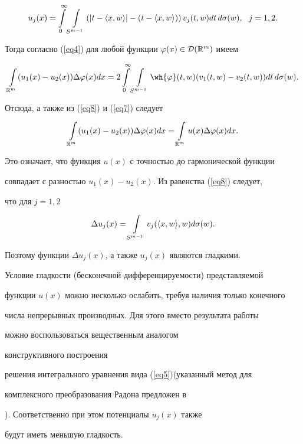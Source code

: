 \begin{pf}
$$


u_{j}(x)=


\int\limits_{0}^{\infty}\int\limits_{S^{m-1}}


\left(|t-\la x,w\ra |-(t-\la x,w\ra )\right)v_j(t,w)dt\,d\sigma(w),


\ \ j=1,2.


$$


Тогда согласно (\ref{eq4}) для любой функции $\varphi(x)\in


{\cal D}(\BR^m)$ имеем 


$$


\int\limits_{\BR^m} (u_1(x)-u_2(x))\Delta\varphi(x)dx=


2\int\limits_{0}^{\infty}\int\limits_{S^{m-1}}\wh{\varphi}(t,w)


(v_1(t,w)-v_2(t,w))dt\,d\sigma(w).


$$


Отсюда, а также из (\ref{eq8}) и (\ref{eq7}) следует


$$


\int\limits_{\BR^m} 


(u_1(x)-u_2(x))\Delta\varphi(x)dx=\int\limits_{\BR^m}


u(x)\Delta\varphi(x)dx.


$$


Это означает, что функция $u(x)$ с точностью до гармонической функции 


совпадает с разностью $u_1(x)-u_2(x)$. Из равенства (\ref{eq8}) следует,


что для $j=1,2$


$$


\Delta u_j(x)=\int\limits_{S^{m-1}}v_j(\la x,w\ra ,w)d\sigma(w).


$$


Поэтому функции $\Delta u_j(x)$, а также $u_j(x)$ являются гладкими. 


\end{pf}





\begin{notenonum}


Условие гладкости (бесконечной дифференцируемости) представляемой


функции $u(x)$ можно несколько ослабить, требуя наличия только конечного


числа непрерывных производных. Для этого вместо результата работы 


\cite{Hertle} можно воспользоваться вещественным аналогом 


конструктивного построения


решения интегрального уравнения вида (\ref{eq5})(указанный метод для 


комплексного преобразования Радона  предложен в 


\cite{Sekerin2}). Соответственно при этом потенциалы $u_j(x)$ также


будут иметь меньшую гладкость.


\end{notenonum}





